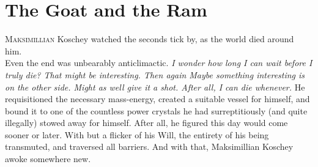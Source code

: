\chapter{The Goat and the Ram}


\lettrine{M}{aksimillian} Koschey watched the seconds tick by, as the world died around him.\\Even the end was unbearably anticlimactic.
\SmallVSpace
\emph{I wonder how long I can wait before I truly die? That might be interesting. Then again{\el} Maybe something interesting is on the other side. Might as well give it a shot. After all, I can die whenever.}
\SmallVSpace
He requisitioned the necessary mass-energy, created a suitable vessel for himself, and bound it to one of the countless power crystals he had surreptitiously (and quite illegally) stowed away for himself. After all, he figured this day would come sooner or later.
\SmallVSpace
With but a flicker of his Will, the entirety of his being transmuted, and traversed all barriers.
\SomeVSpace
And with that, Maksimillian Koschey awoke somewhere new.
\simpleline
{}

